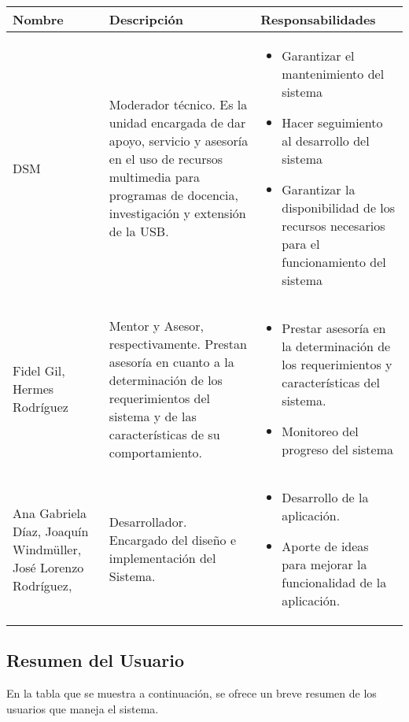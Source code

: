 \documentclass{article}
\begin{document}
	\begin{center}
		\begin{tabular}{| p{} | p{} | p{} |}
			\hline  %
			Nombre & Descripción & Responsabilidades \\ \hline
% 			
			DSM &
			Moderador técnico. Es la unidad encargada de
			dar apoyo, servicio y asesoría en el uso de recursos
			multimedia para programas de docencia,
			investigación y extensión de la USB. & 
			\begin{itemize}
				\item Garantizar el mantenimiento del sistema
				\item Hacer seguimiento al desarrollo del sistema
				\item Garantizar la disponibilidad de los recursos necesarios para el funcionamiento del sistema
			\end{itemize}
			\\ \hline
% 			
			\raggedright Fidel Gil, \linebreak Hermes Rodríguez &
			Mentor y Asesor, respectivamente. Prestan asesoría en cuanto a la determinación de los requerimientos del sistema y de las características de su comportamiento. &
			\begin{itemize}
				\item Prestar asesoría en la determinación de los requerimientos y características del sistema.
				\item Monitoreo del progreso del sistema
			\end{itemize}
			\\ \hline
% 			
			\raggedright
			Ana Gabriela Díaz,
				\linebreak
			Joaquín Windmüller,
				\linebreak
			José Lorenzo Rodríguez, &
			Desarrollador. Encargado del diseño e implementación del Sistema. &
			\begin{itemize}
				\item Desarrollo de la aplicación.
				\item Aporte de ideas para mejorar la funcionalidad de la aplicación.
			\end{itemize}
			\\ \hline
		\end{tabular}
	\end{center}

	\subsection{Resumen del Usuario}
	En la tabla que se muestra a continuación, se ofrece un breve resumen de los usuarios que maneja el sistema.
	
\end{document}
